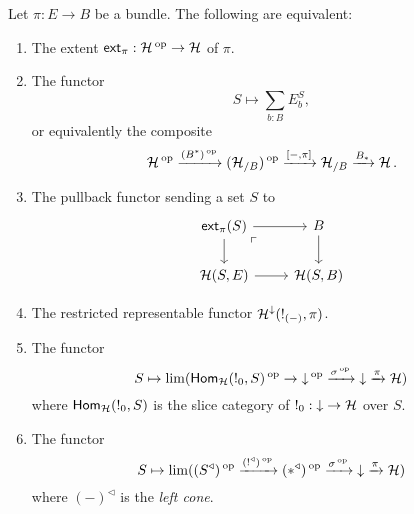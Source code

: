 \begin{prop}\label{prop:set.characterizing.extent}
  Let $\pi : E \to B$ be a bundle. The following are equivalent:
  \begin{enumerate}
  \item The extent $\ext_{\pi} : \Ha\op \to \Ha$ of $\pi$.
  \item The functor
    $$S \mapsto \sum_{b : B} E_b^S,$$
    or equivalently the composite
  $$\Ha\op \xto{(B^{\ast})\op} (\Ha_{/B})\op \xto{[-, \pi]} \Ha_{/B}
  \xto{B_{\ast}} \Ha.$$
\item The pullback functor sending a set $S$ to 
\[
\begin{tikzcd}
	\ext_\pi(S)\ar[r]\ar[d]\arrow[dr, phantom,
      "\ulcorner" very near start]&
	B\ar[d]\\
	\Ha(S,E)\ar[r]&
	\Ha(S,B)
\end{tikzcd}
\]
\item The restricted representable functor
  $\Ha^{\down}(!_{(-)}, \pi)$.
\item The functor
  $$S \mapsto \lim(\Hom_{\Ha}(!_0, S)\op \to \down\op \xto{\sigma\op} \down \xto{\pi} \Ha)$$
  where $\Hom_{\Ha}(!_0, S)$ is the slice category of $!_0 : \down \to
  \Ha$ over $S$.
\item The functor
  $$S \mapsto \lim(( S^{\triangleleft} )\op \xto{( !^{\triangleleft} )\op}
  (\ast^{\triangleleft})\op \xto{\sigma\op} \down
  \xto{\pi} \Ha)$$
  where $(-)^{\triangleleft}$ is the \emph{left cone}.
  \end{enumerate}
\end{prop}
